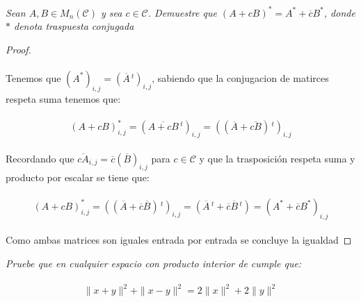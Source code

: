 \documentclass[11pt,letterpaper]{article}
\newcommand{\C}{\mathcal{C}}
\begin{document}
\begin{tcolorbox}[
	title = \textcolor{black}{\textcolor{white}{Problema 6}},]
\textit{Sean $A,B \in M_{n}(\C)$ y sea $c\in \C$. Demuestre que $(A+cB)^*=A^*+\overline{c}B^*$, donde $*$ denota traspuesta conjugada 
}
\end{tcolorbox}
\begin{proof}\,\\
	\,\\
	Tenemos que $(A^*)_{i,j}=(\overline{A}\,^t)_{i,j}$, sabiendo que la conjugacion de matirces respeta suma tenemos que:\,\\
	\,\\
	\begin{equation*}
		(A+cB)^*_{i,j}=(\overline{A+cB}\,^t)_{i,j}=((\overline{A}+\overline{cB})\,^t)_{i,j}
	\end{equation*}\,\\
	Recordando que $\overline{cA}_{i,j}=\overline{c}(\overline{B})_{i,j}$ para $c\in \C$ y que la trasposici\'on respeta suma y producto por escalar se tiene que:\,\\
	\,\\
	\begin{equation*}
		(A+cB)^*_{i,j}=((\overline{A}+\overline{c}\overline{B})\,^t)_{i,j}=(\overline{A}\,^t+\overline{c}\overline{B}\,^t)=(A^*+\overline{c}B^*)_{i,j}
	\end{equation*}\,\\
	Como ambas matrices son iguales entrada por entrada se concluye la igualdad
\end{proof}
\newpage
\begin{tcolorbox}[
	title = \textcolor{black}{\textcolor{white}{Problema 7}},]
\textit{Pruebe que en cualquier espacio con producto interior de cumple que:\,\\
\,\\
\begin{equation*}
	\|x+y\|^2+\|x-y\|^2=2\|x\|^2+2\|y\|^2
\end{equation*}
}
\end{tcolorbox}
\end{document}

